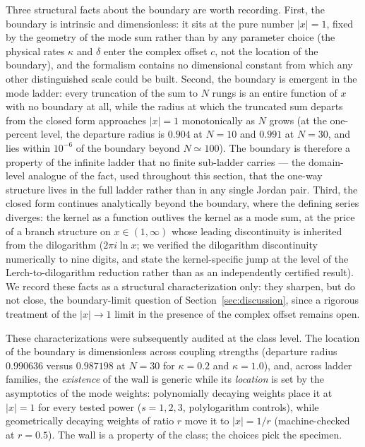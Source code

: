 \documentclass[11pt,a4paper]{article}
\begin{document}
Three structural facts about the boundary are worth
recording. First, the boundary is intrinsic and dimensionless: it sits at the
pure number $|x| = 1$, fixed by the geometry of the mode sum rather than by
any parameter choice (the physical rates $\kappa$ and $\delta$ enter the
complex offset $c$, not the location of the boundary), and the formalism
contains no dimensional constant from which any other distinguished scale
could be built. Second, the boundary is emergent in the mode ladder: every
truncation of the sum to $N$ rungs is an entire function of $x$ with no
boundary at all, while the radius at which the truncated sum departs from
the closed form approaches $|x| = 1$ monotonically as $N$ grows (at the
one-percent level, the departure radius is $0.904$ at $N = 10$ and $0.991$
at $N = 30$, and lies within $10^{-6}$ of the boundary beyond
$N \simeq 100$). The boundary is therefore a property of the infinite
ladder that no finite sub-ladder carries --- the domain-level analogue of
the fact, used throughout this section, that the one-way structure lives in
the full ladder rather than in any single Jordan pair. Third, the closed
form continues analytically beyond the boundary, where the defining series
diverges: the kernel as a function outlives the kernel as a mode sum, at
the price of a branch structure on $x \in (1, \infty)$ whose leading
discontinuity is inherited from the dilogarithm ($2\pi i \ln x$; we
verified the dilogarithm discontinuity numerically to nine digits, and
state the kernel-specific jump at the level of the Lerch-to-dilogarithm
reduction rather than as an independently certified result). We record
these facts as a structural characterization only: they sharpen, but do
not close, the boundary-limit question of Section~\ref{sec:discussion},
since a rigorous treatment of the $|x| \to 1$ limit in the presence of the
complex offset remains open.

These characterizations were subsequently audited at the class level.
The location of the boundary is dimensionless across coupling strengths
(departure radius $0.990636$ versus $0.987198$ at $N = 30$ for
$\kappa = 0.2$ and $\kappa = 1.0$), and, across ladder families, the
\emph{existence} of the wall is generic while its \emph{location} is set
by the asymptotics of the mode weights: polynomially decaying weights
place it at $|x| = 1$ for every tested power ($s = 1, 2, 3$, polylogarithm
controls), while geometrically decaying weights of ratio $r$ move it to
$|x| = 1/r$ (machine-checked at $r = 0.5$). The wall is a property of the
class; the choices pick the specimen.
\end{document}
